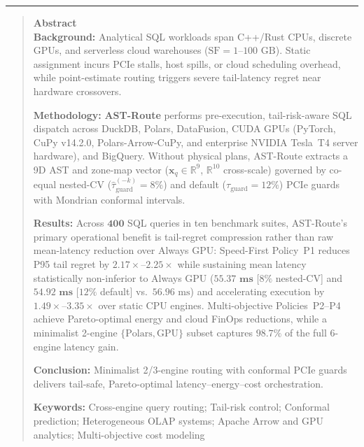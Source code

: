 \documentclass[10pt,a4paper]{article}
\begin{document}
\noindent\rule{\textwidth}{0.8pt}
\begin{quote}
\small\sffamily
\textbf{\color{springerblue}Abstract}\\[0.3em]
\textbf{Background:} Analytical SQL workloads span C++/Rust CPUs, discrete GPUs, and serverless cloud warehouses ($\text{SF}=1\text{--}100\text{ GB}$). Static assignment incurs PCIe stalls, host spills, or cloud scheduling overhead, while point-estimate routing triggers severe tail-latency regret near hardware crossovers.

\textbf{Methodology:} \textbf{AST-Route} performs pre-execution, tail-risk-aware SQL dispatch across DuckDB, Polars, DataFusion, CUDA GPUs (PyTorch, CuPy v14.2.0, Polars-Arrow-CuPy, and enterprise NVIDIA Tesla~T4 server hardware), and BigQuery. Without physical plans, AST-Route extracts a 9D AST and zone-map vector ($\mathbf{x}_q \in \mathbb{R}^{9}$, $\mathbb{R}^{10}$ cross-scale) governed by co-equal nested-CV ($\hat{\tau}_{\text{guard}}^{(-k)}=8\%$) and default ($\tau_{\text{guard}}=12\%$) PCIe guards with Mondrian conformal intervals.

\textbf{Results:} Across $\mathbf{400}$ SQL queries in ten benchmark suites, AST-Route's primary operational benefit is tail-regret compression rather than raw mean-latency reduction over Always GPU: Speed-First Policy~P1 reduces P95 tail regret by $\mathbf{2.17\times\text{--}2.25\times}$ while sustaining mean latency statistically non-inferior to Always GPU ($\mathbf{55.37\text{ ms}}$ [$8\%$ nested-CV] and $\mathbf{54.92\text{ ms}}$ [$12\%$ default] vs.\ $56.96\text{ ms}$) and accelerating execution by $\mathbf{1.49\times\text{--}3.35\times}$ over static CPU engines. Multi-objective Policies~P2--P4 achieve Pareto-optimal energy and cloud FinOps reductions, while a minimalist 2-engine $\{\text{Polars}, \text{GPU}\}$ subset captures $\mathbf{98.7\%}$ of the full 6-engine latency gain.

\textbf{Conclusion:} Minimalist 2/3-engine routing with conformal PCIe guards delivers tail-safe, Pareto-optimal latency--energy--cost orchestration.

\noindent\textbf{Keywords:} Cross-engine query routing; Tail-risk control; Conformal prediction; Heterogeneous OLAP systems; Apache Arrow and GPU analytics; Multi-objective cost modeling
\end{quote}
\end{document}

